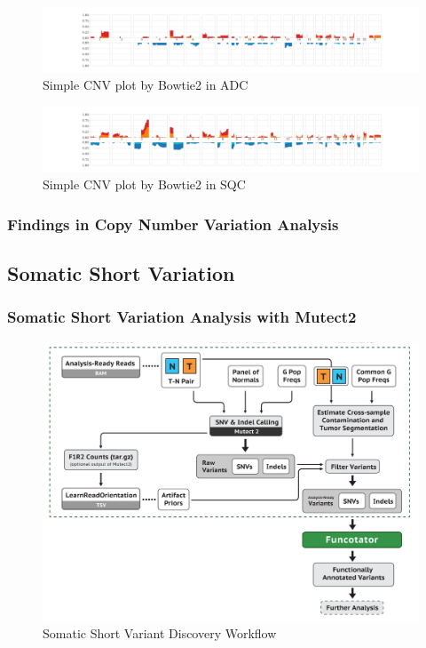 \documentclass[11pt,a4paper,onecolumn,oneside]{report}
\begin{document}
                \begin{figure}[p]
                    \centering
                    \includegraphics[width=\linewidth]{figures/Sequenza/Bowtie2-simple-ADC.pdf}
                    \caption{Simple CNV plot by Bowtie2 in ADC}
                    \label{fig:SimpleCNV-Bowtie2-ADC}
                \end{figure}

                \begin{figure}[p]
                    \centering
                    \includegraphics[width=\linewidth]{figures/Sequenza/Bowtie2-simple-SQC.pdf}
                    \caption{Simple CNV plot by Bowtie2 in SQC}
                    \label{fig:SimpleCNV-Bowtie2-SQC}
                \end{figure}

            \subsubsection{Findings in Copy Number Variation Analysis}

        \subsection{Somatic Short Variation}
            \subsubsection{Somatic Short Variation Analysis with Mutect2}
                \begin{figure}[p]
                    \centering
                    \includegraphics[width=0.6 \linewidth]{figures/Workflow/somatic_short_variants.png}
                    \caption{Somatic Short Variant Discovery Workflow \protect\cite{gatk1, gatk2}}
                    \label{fig:Mutect2}
                \end{figure}
\end{document}
